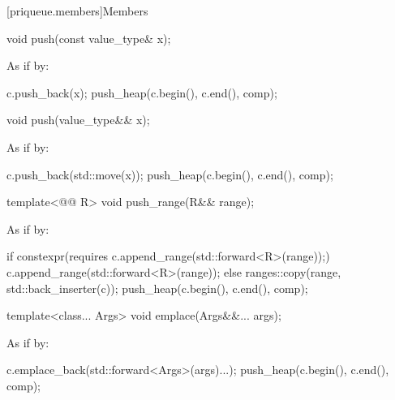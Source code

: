 \documentclass{wg21}
\begin{document}
[priqueue.members]{Members}

%
\begin{itemdecl}
    void push(const value_type& x);
\end{itemdecl}

\begin{itemdescr}
    \pnum
    \effects
    As if by:
    \begin{codeblock}
        c.push_back(x);
        push_heap(c.begin(), c.end(), comp);
    \end{codeblock}
\end{itemdescr}

%
\begin{itemdecl}
    void push(value_type&& x);
\end{itemdecl}

\begin{itemdescr}
    \pnum
    \effects
    As if by:
    \begin{codeblock}
        c.push_back(std::move(x));
        push_heap(c.begin(), c.end(), comp);
    \end{codeblock}
\end{itemdescr}

\begin{addedblock}
%
\begin{itemdecl}
template<@@ R>
void push_range(R&& range);
\end{itemdecl}
\begin{itemdescr}
    \pnum
    \effects
    As if by:
    \begin{codeblock}
        if constexpr(requires {c.append_range(std::forward<R>(range));})
        {
             c.append_range(std::forward<R>(range));
        }
        else {
            ranges::copy(range, std::back_inserter(c));
        }
        push_heap(c.begin(), c.end(), comp);
    \end{codeblock}
\end{itemdescr}
\end{addedblock}


%
\begin{itemdecl}
    template<class... Args> void emplace(Args&&... args);
\end{itemdecl}

\begin{itemdescr}
    \pnum
    \effects
    As if by:
    \begin{codeblock}
        c.emplace_back(std::forward<Args>(args)...);
        push_heap(c.begin(), c.end(), comp);
    \end{codeblock}
\end{itemdescr}
\end{document}

